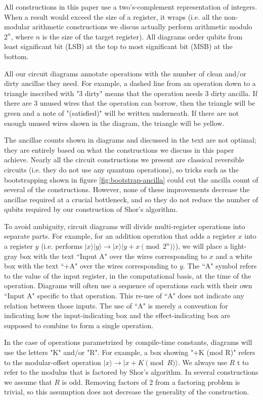 \documentclass[twocolumn]{article}
\begin{document}
All constructions in this paper use a two's-complement representation of integers.
When a result would exceed the size of a register, it wraps (i.e. all the non-modular arithmetic constructions we discus actually perform arithmetic modulo $2^n$, where $n$ is the size of the target register).
All diagrams order qubits from least significant bit (LSB) at the top to most significant bit (MSB) at the bottom.

All our circuit diagrams annotate operations with the number of clean and/or dirty ancillae they need.
For example, a dashed line from an operation down to a triangle inscribed with "3 dirty" means that the operation needs 3 dirty ancilla.
If there are 3 unused wires that the operation can borrow, then the triangle will be green and a note of "(satisfied)" will be written underneath.
If there are not enough unused wires shown in the diagram, the triangle will be yellow.

The ancillae counts shown in diagrams and discussed in the text are not optimal; they are entirely based on what the constructions we discuss in this paper achieve.
Nearly all the circuit constructions we present are classical reversible circuits (i.e. they do not use any quantum operations), so tricks such as the bootstrapping shown in figure \ref{fig:bootstrap-ancilla} could cut the ancilla count of several of the constructions.
However, none of these improvements decrease the ancillae required at a crucial bottleneck, and so they do not reduce the number of qubits required by our construction of Shor's algorithm.

To avoid ambiguity, circuit diagrams will divide multi-register operations into separate parts.
For example, for an addition operation that adds a register $x$ into a register $y$ (i.e. performs $|x\rangle |y\rangle \rightarrow |x\rangle |y + x \pmod{2^n} \rangle$), we will place a light-gray box with the text ``Input A" over the wires corresponding to $x$ and a white box with the text ``+A" over the wires corresponding to $y$.
The ``A" symbol refers to the value of the input register, in the computational basis, at the time of the operation.
Diagrams will often use a sequence of operations each with their own ``Input A" specific to that operation.
This re-use of ``A" does not indicate any relation between those inputs.
The use of ``A" is merely a convention for indicating how the input-indicating box and the effect-indicating box are supposed to combine to form a single operation.

In the case of operations parametrized by compile-time constants, diagrams will use the letters "K" and/or "R".
For example, a box showing "+K (mod R)" refers to the modular-offset operation $|x\rangle \rightarrow |x+K \pmod{R}\rangle$.
We always use $R$ t to refer to the modulus that is factored by Shor's algorithm.
In several constructions we assume that $R$ is odd.
Removing factors of 2 from a factoring problem is trivial, so this assumption does not decrease the generality of the construction.
\end{document}
